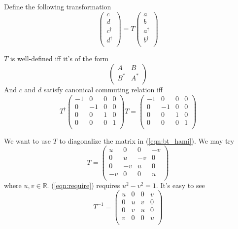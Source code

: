 \documentclass[12pt]{book}
\begin{document}
	Define the following transformation
	\begin{equation}
		\left(\begin{array}{c}
		c\\
		d\\
		c^\dagger\\
		d^\dagger\\
		\end{array}\right)
		=
		T
		\left(\begin{array}{c}
		a\\
		b\\
		a^\dagger\\
		b^\dagger\\
		\end{array}\right)
	\end{equation}
	
	$T$ is well-defined iff it's of the form
	\begin{equation}
		\left(\begin{array}{cc}
		A&B\\
		B^*&A^*\\
		\end{array}\right)
	\end{equation}
	And $c$ and $d$ satisfy canonical commuting relation iff
	\begin{equation}
	T^\dagger
	\left(\begin{array}{cccc}
	-1&0&0&0\\
	0&-1&0&0\\
	0&0&1&0\\
	0&0&0&1\\
	\end{array}\right)T=
	\left(\begin{array}{cccc}
	-1&0&0&0\\
	0&-1&0&0\\
	0&0&1&0\\
	0&0&0&1\\
	\end{array}\right) \label{eqn:require}
	\end{equation}
	
	We want to use $T$ to diagonalize the matrix in (\ref{eqn:bt_hami}). We may try
	\begin{equation}
	T=
	\left(\begin{array}{cccc}
	u&0&0&-v\\
	0&u&-v&0\\
	0&-v&u&0\\
	-v&0&0&u\\
	\end{array}\right)
	\end{equation}
	where $u,v\in \mathbb R$. (\ref{eqn:require}) requires $u^2-v^2=1$. It's easy to see
	\begin{equation}
	T^{-1}=
	\left(\begin{array}{cccc}
	u&0&0&v\\
	0&u&v&0\\
	0&v&u&0\\
	v&0&0&u\\
	\end{array}\right)
	\end{equation}
	
\end{document}
